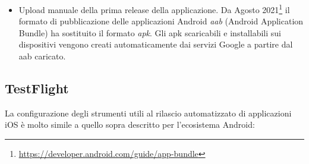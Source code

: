 \begin{itemize}
\begin{itemize}
        \begin{listing}[H]
        \inputminted{bash}{code/4-jks}
        \caption{Creazione, codifica e decodifica della chiave JKS}
        \end{listing}
    \end{itemize}
    \item Upload manuale della prima release della applicazione. Da Agosto 2021\footnote{\url{https://developer.android.com/guide/app-bundle}} il formato di pubblicazione delle applicazioni Android \textit{aab} (Android Application Bundle) ha sostituito il formato \textit{apk}. Gli apk scaricabili e installabili sui dispositivi vengono creati automaticamente dai servizi Google a partire dal aab caricato.
\end{itemize}

\subsection{TestFlight}
La configurazione degli strumenti utili al rilascio automatizzato di applicazioni iOS è molto simile a quello sopra descritto per l'ecosistema Android: 
